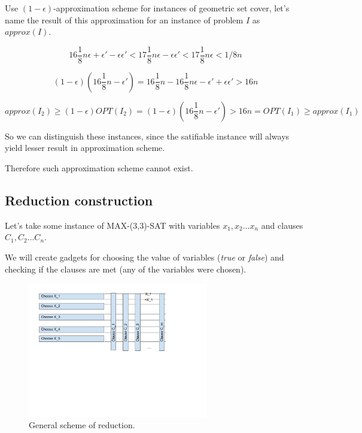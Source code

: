 Use $(1-\epsilon)$-approximation scheme for instances of geometric
set cover, let's name the result of this approximation
for an instance of problem $I$ as $approx(I)$.

$$16\frac{1}{8}n\epsilon + \epsilon' - \epsilon\epsilon' 
	< 17\frac{1}{8}n\epsilon - \epsilon\epsilon' 
	< 17\frac{1}{8}n\epsilon < 1/8n$$
	
$$(1-\epsilon)(16\frac{1}{8}n - \epsilon') =
	16\frac{1}{8}n - 16\frac{1}{8}n\epsilon - \epsilon' + \epsilon\epsilon'
	> 16n$$

$$approx(I_2) \ge (1-\epsilon)OPT(I_2) = (1-\epsilon)(16\frac{1}{8}n - \epsilon')
	> 16n = OPT(I_1)\ge approx(I_1)$$ 

So we can distinguish these instances, since the satifiable instance
will always yield lesser result in approximation scheme.

Therefore such approximation scheme cannot exist.

\subsection{Reduction construction}

Let's take some instance of  MAX-(3,3)-SAT with
variables $x_1, x_2 \ldots x_n$
and clauses $C_1, C_2 \dots C_n$.

We will create gadgets for choosing the value
of variables (\textit{true} or \textit{false}) and checking
if the clauses are met (any of the variables were chosen).

\begin{figure}[h]
\includegraphics[width=0.7\textwidth]{segment_apx_sketch.jpg}
\caption{General scheme of reduction.}
\label{fig:segment_apx}
\end{figure}

